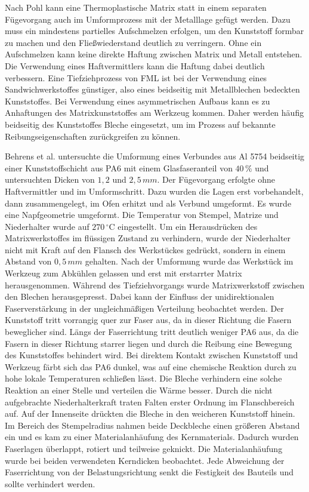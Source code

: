 Nach Pohl \cite{Pohl.2000} kann eine Thermoplastische Matrix statt in einem separaten Fügevorgang auch im Umformprozess mit der Metalllage gefügt werden. Dazu muss ein mindestens partielles Aufschmelzen erfolgen, um den Kunststoff formbar zu machen und den Fließwiederstand deutlich zu verringern. Ohne ein Aufschmelzen kann keine direkte Haftung zwischen Matrix und Metall entstehen. Die Verwendung eines Haftvermittlers kann die Haftung dabei deutlich verbessern. 
Eine Tiefziehprozess von FML ist bei der Verwendung eines Sandwichwerkstoffes günstiger, also eines beidseitig mit Metallblechen bedeckten Kunststoffes. Bei Verwendung eines asymmetrischen Aufbaus kann es zu Anhaftungen des Matrixkunststoffes am Werkzeug kommen. Daher werden häufig beidseitig des Kunststoffes Bleche eingesetzt, um im Prozess auf bekannte Reibungseigenschaften zurückgreifen zu können. \cite{Behrens.2014}



Behrens et al. \cite{Behrens.2014} untersuchte die Umformung eines Verbundes aus Al 5754 beidseitig einer Kunststoffschicht aus PA6 mit einem Glasfaseranteil von $40\,\%$ und untersuchten Dicken von $1,2$ und $2,5 \, mm$. Der Fügevorgang erfolgte ohne Haftvermittler und im Umformschritt. Dazu wurden die Lagen erst vorbehandelt, dann zusammengelegt, im Ofen erhitzt und als Verbund umgeformt. Es wurde eine Napfgeometrie umgeformt. 
Die Temperatur von Stempel, Matrize und Niederhalter wurde auf $270 \, ^\circ \text{C}$ eingestellt. Um ein Herausdrücken des Matrixwerkstoffes im flüssigen Zustand zu verhindern, wurde der Niederhalter nicht mit Kraft auf den Flansch des Werkstückes gedrückt, sondern in einem Abstand von $0,5\,mm$ gehalten. Nach der Umformung wurde das Werkstück im Werkzeug zum Abkühlen gelassen und erst mit erstarrter Matrix herausgenommen. 
Während des Tiefziehvorgangs wurde Matrixwerkstoff zwischen den Blechen herausgepresst. Dabei kann der Einfluss der unidirektionalen Faserverstärkung in der ungleichmäßigen Verteilung beobachtet werden. Der Kunststoff tritt vorrangig quer zur Faser aus, da in dieser Richtung die Fasern beweglicher sind. Längs der Faserrichtung tritt deutlich weniger PA6 aus, da die Fasern in dieser Richtung starrer liegen und durch die Reibung eine Bewegung des Kunststoffes behindert wird. 
Bei direktem Kontakt zwischen Kunststoff und Werkzeug färbt sich das PA6 dunkel, was auf eine chemische Reaktion durch zu hohe lokale Temperaturen schließen lässt. Die Bleche verhindern eine solche Reaktion an einer Stelle und verteilen die Wärme besser. 
Durch die nicht aufgebrachte Niederhalterkraft traten Falten erster Ordnung im Flanschbereich auf. Auf der Innenseite drückten die Bleche in den weicheren Kunststoff hinein. Im Bereich des Stempelradius nahmen beide Deckbleche einen größeren Abstand ein und es kam zu einer Materialanhäufung des Kernmaterials. Dadurch wurden Faserlagen überlappt, rotiert und teilweise geknickt. Die Materialanhäufung wurde bei beiden verwendeten Kerndicken beobachtet. 
Jede Abweichung der Faserrichtung von der Belastungsrichtung senkt die Festigkeit des Bauteils und sollte verhindert werden. 

